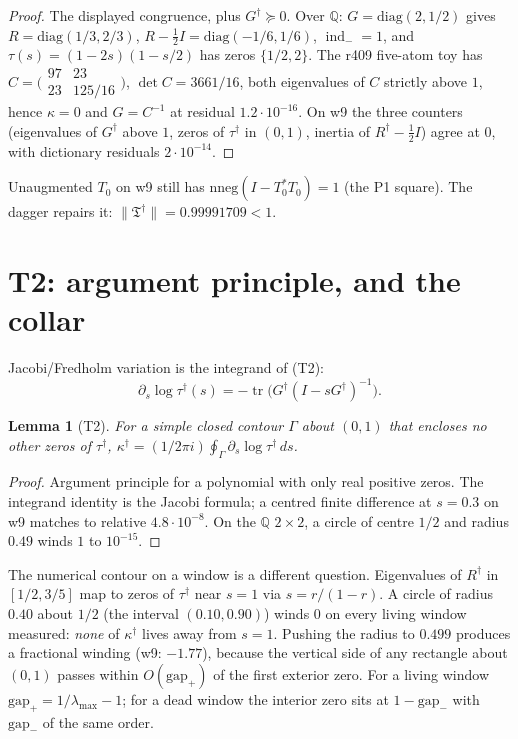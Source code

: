 \documentclass[11pt]{article}
\newtheorem{lemma}{Lemma}
\theoremstyle{remark}
\newcommand{\Rd}{R^{\dagger}}
\newcommand{\Td}{\mathfrak{T}^{\dagger}}
\newcommand{\Gd}{G^{\dagger}}
\newcommand{\taud}{\tau^{\dagger}}
\newcommand{\kapd}{\kappa^{\dagger}}
\newcommand{\indm}{\operatorname{ind}_{-}}
\newcommand{\half}{\tfrac12}
\begin{document}
\begin{proof}
The displayed congruence, plus $\Gd\succeq 0$.
Over $\mathbb{Q}$: $G=\mathrm{diag}(2,1/2)$ gives
$R=\mathrm{diag}(1/3,2/3)$, $R-\half I=\mathrm{diag}(-1/6,1/6)$,
$\indm=1$, and $\tau(s)=(1-2s)(1-s/2)$ has zeros $\{1/2,2\}$.
The r409 five-atom toy has
$C=\bigl(\begin{smallmatrix}97&23\\23&125/16\end{smallmatrix}\bigr)$,
$\det C=3661/16$, both eigenvalues of $C$ strictly above $1$,
hence $\kappa=0$ and $G=C^{-1}$ at residual $1.2\cdot 10^{-16}$.
On w9 the three counters (eigenvalues of $\Gd$ above $1$,
zeros of $\taud$ in $(0,1)$, inertia of $\Rd-\half I$) agree
at $0$, with dictionary residuals $2\cdot 10^{-14}$.
\end{proof}

Unaugmented $T_{0}$ on w9 still has $\mathrm{nneg}(I-T_{0}^{*}T_{0})=1$
(the P1 square).  The dagger repairs it: $\|\Td\|=0.99991709<1$.

\section{T2: argument principle, and the collar}\label{sec:t2}

Jacobi/Fredholm variation is the integrand of (T2):
\[
\partial_{s}\log\taud(s)
=-\operatorname{tr}\bigl(\Gd(I-s\Gd)^{-1}\bigr).
\]

\begin{lemma}[T2]\label{lem:t2}
For a simple closed contour $\Gamma$ about $(0,1)$ that
encloses no other zeros of $\taud$,
$\kapd=(1/2\pi i)\oint_{\Gamma}\partial_{s}\log\taud\,ds$.
\end{lemma}

\begin{proof}
Argument principle for a polynomial with only real positive
zeros.  The integrand identity is the Jacobi formula; a
centred finite difference at $s=0.3$ on w9 matches to relative
$4.8\cdot 10^{-8}$.
On the $\mathbb{Q}$ $2\times 2$, a circle of centre $1/2$ and
radius $0.49$ winds $1$ to $10^{-15}$.
\end{proof}

The numerical contour on a window is a different question.
Eigenvalues of $\Rd$ in $[1/2,3/5]$ map to zeros of $\taud$
near $s=1$ via $s=r/(1-r)$.  A circle of radius $0.40$ about
$1/2$ (the interval $(0.10,0.90)$) winds $0$ on every living
window measured: \emph{none} of $\kapd$ lives away from $s=1$.
Pushing the radius to $0.499$ produces a fractional winding
(w9: $-1.77$), because the vertical side of any rectangle
about $(0,1)$ passes within $O(\mathrm{gap}_{+})$ of the first
exterior zero.  For a living window
$\mathrm{gap}_{+}=1/\lambda_{\max}-1$; for a dead window the
interior zero sits at $1-\mathrm{gap}_{-}$ with
$\mathrm{gap}_{-}$ of the same order.
\end{document}

